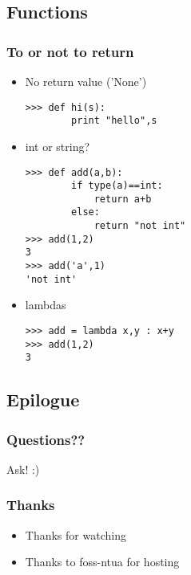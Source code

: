 \documentclass{beamer}
\begin{document}
\subsection{Functions}
\begin{frame}[fragile]
    \frametitle{To or not to return}
    \begin{itemize}
        \item<1-> No return value ('None')
            \begin{verbatim}
>>> def hi(s):
        print "hello",s
            \end{verbatim}
        \item<2-> int or string?
            \begin{verbatim}
>>> def add(a,b):
        if type(a)==int:
            return a+b
        else:
            return "not int"
>>> add(1,2)
3
>>> add('a',1)
'not int'
            \end{verbatim}
        \item<3-> lambdas
            \begin{verbatim}
>>> add = lambda x,y : x+y
>>> add(1,2)
3
            \end{verbatim}
    \end{itemize}
\end{frame}

\subsection{Epilogue}
\begin{frame}
    \frametitle{Questions??}
    Ask! :)
\end{frame}

\begin{frame}[fragile]
    \frametitle{Thanks}
    \begin{itemize}
        \item Thanks for watching
        \item Thanks to foss-ntua for hosting
    \end{itemize}
\end{frame}
\end{document}
